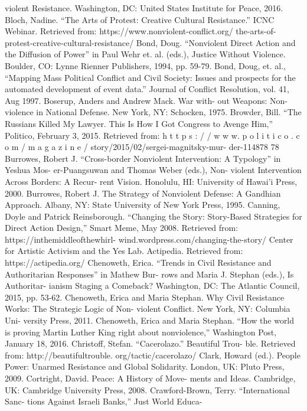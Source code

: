 \documentclass[twoside,a4paper,12pt,fleqn,openany]{extbook}
\begin{document}
violent Resistance. Washington, DC: United
States Institute for Peace, 2016.
Bloch, Nadine. “The Arts of Protest: Creative
Cultural Resistance.” ICNC Webinar. Retrieved
from: https://www.nonviolent-conflict.org/
the-arts-of-protest-creative-cultural-resistance/
Bond, Doug. “Nonviolent Direct Action and the
Diffusion of Power” in Paul Wehr et. al. (eds.),
Justice Without Violence. Boulder, CO: Lynne
Rienner Publishers, 1994, pp. 59-79.
Bond, Doug, et. al., “Mapping Mass Political
Conflict and Civil Society: Issues and prospects
for the automated development of event data.”
Journal of Conflict Resolution, vol. 41, Aug 1997.
Boserup, Anders and Andrew Mack. War with-
out Weapons: Non-violence in National
Defense. New York, NY: Schocken, 1975.
Browder, Bill. “The Russians Killed My Lawyer.
This Is How I Got Congress to Avenge Him,”
Politico, February 3, 2015. Retrieved from:
h t t p s : / / w w w. p o l i t i c o . c o m / m a g a z i n e /
story/2015/02/sergei-magnitsky-mur-
der-114878
78
Burrowes, Robert J. “Cross-border Nonviolent
Intervention: A Typology” in Yeshua Mos-
er-Puangsuwan and Thomas Weber (eds.), Non-
violent Intervention Across Borders: A Recur-
rent Vision. Honolulu, HI: University of Hawai’i
Press, 2000.
Burrowes, Robert J. The Strategy of Nonviolent
Defense: A Gandhian Approach. Albany, NY:
State University of New York Press, 1995.
Canning, Doyle and Patrick Reinsborough.
“Changing the Story: Story-Based Strategies for
Direct Action Design,” Smart Meme, May 2008.
Retrieved from: https://inthemiddleofthewhirl-
wind.wordpress.com/changing-the-story/
Center for Artistic Activism and the Yes Lab.
Actipedia. Retrieved from: https://actipedia.org/
Chenoweth, Erica. “Trends in Civil Resistance
and Authoritarian Responses” in Mathew Bur-
rows and Maria J. Stephan (eds.), Is Authoritar-
ianism Staging a Comeback? Washington, DC:
The Atlantic Council, 2015, pp. 53-62.
Chenoweth, Erica and Maria Stephan. Why Civil
Resistance Works: The Strategic Logic of Non-
violent Conflict. New York, NY: Columbia Uni-
versity Press, 2011.
Chenoweth, Erica and Maria Stephan. “How the
world is proving Martin Luther King right about
nonviolence,” Washington Post, January 18,
2016.
Christoff, Stefan. “Cacerolazo.” Beautiful Trou-
ble. Retrieved from: http://beautifultrouble.
org/tactic/cacerolazo/
Clark, Howard (ed.). People Power: Unarmed
Resistance and Global Solidarity. London, UK:
Pluto Press, 2009.
Cortright, David. Peace: A History of Move-
ments and Ideas. Cambridge, UK: Cambridge
University Press, 2008.
Crawford-Brown, Terry. “International Sanc-
tions Against Israeli Banks,” Just World Educa-
\end{document}
